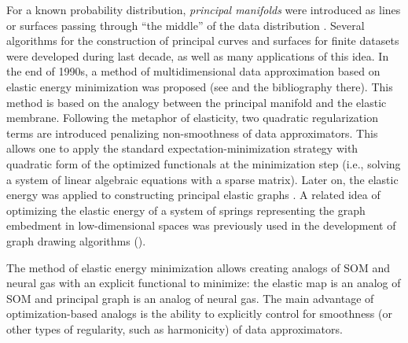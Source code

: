 \documentclass[graybox]{archivesofdatascience}
\begin{document}
For a known probability distribution, {\it principal manifolds} were
introduced as lines or surfaces passing through ``the middle'' of
the data distribution \citep{hastie1989}. Several  algorithms for
the construction of principal curves \citep{kegl2002} and surfaces for
finite datasets were developed during last decade, as well as many
applications of this idea. In the end of 1990s, a method of
multidimensional data approximation based on elastic energy
minimization was  proposed (see \citep{gorban1999neural,zinov2000,gorban2005elastic,Gorban2001ihespreprint,GorbanBook,GorbanHand} and the
bibliography there). This method is based on the analogy between the
principal manifold and the elastic membrane. Following
the metaphor of elasticity, two quadratic regularization terms are introduced
penalizing non-smoothness of data approximators.
This allows one to apply the standard expectation-minimization strategy
with quadratic form of the optimized functionals at the minimization step
(i.e., solving a system of linear algebraic equations with a sparse matrix).
Later on, the elastic energy was applied to constructing principal
elastic graphs \citep{gorban2007topological}. A related idea of optimizing the elastic energy of a system of springs representing
the graph embedment in low-dimensional spaces
was previously used in the development of graph drawing
algorithms (\cite{fruchterman1991graph,Kobourov2012}).

\iffalse
This intuitive vision
was transformed into the mathematical notion of {\it
self-consistency}: every point  of the principal manifold  is
a conditional expectation of all points  that are projected into
. Neither manifold, nor projection should be linear: just a
differentiable projection  of the data space (usually it is
 or a domain in ) onto the manifold  with the
self-consistency requirement for conditional expectations:  For a finite dataset , only one or
zero data points are typically projected into a point of the
principal manifold. In order to avoid overfitting, we have to
introduce smoothers that become an essential part of the principal
manifold construction algorithms.


SOMs give one of the most popular approximations for principal manifolds:
we can take for  a fragment of a regular -dimensional grid and
consider the resulting SOM as the approximation to the
-dimensional principal manifold (see, for example,
\citep{Mulier95,Ritter92}).
\fi

The method of elastic energy minimization allows creating analogs of SOM \citep{kohonen1982self} and neural gas \citep{martinetz1993neural} with an explicit functional to minimize: the elastic map is an analog of SOM and principal graph is an analog of neural gas. The main advantage of optimization-based analogs is the ability to explicitly control for smoothness (or other types of regularity, such as harmonicity) of data approximators.
\end{document}

